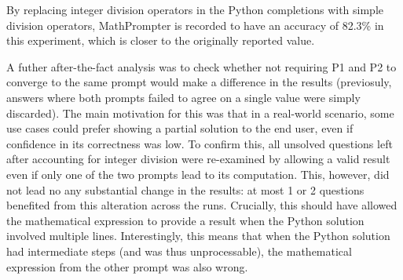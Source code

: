 By replacing integer division operators in the Python completions with simple division operators, MathPrompter is recorded to have an accuracy of 82.3\% in this experiment, which is closer to the originally reported value. 

A futher after-the-fact analysis was to check whether not requiring P1 and P2 to converge to the same prompt would make a difference in the results (previosuly, answers where both prompts failed to agree on a single value were simply discarded). The main motivation for this was that in a real-world scenario, some use cases could prefer showing a partial solution to the end user, even if confidence in its correctness was low. To confirm this, all unsolved questions left after accounting for integer division were re-examined by allowing a valid result even if only one of the two prompts lead to its computation. This, however, did not lead no any substantial change in the results: at most 1 or 2 questions benefited from this alteration across the runs. Crucially, this should have allowed the mathematical expression to provide a result when the Python solution involved multiple lines. Interestingly, this means that when the Python solution had intermediate steps (and was thus unprocessable), the mathematical expression from the other prompt was also wrong.